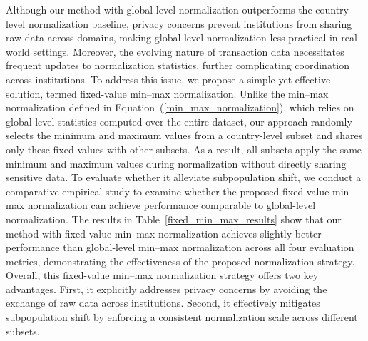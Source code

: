 Although our method with global-level normalization outperforms the country-level normalization baseline, privacy concerns prevent institutions from sharing raw data across domains, making global-level normalization less practical in real-world settings. Moreover, the evolving nature of transaction data necessitates frequent updates to normalization statistics, further complicating coordination across institutions. To address this issue, we propose a simple yet effective solution, termed fixed-value min–max normalization. Unlike the min–max normalization defined in Equation~(\ref{min_max_normalization}), which relies on global-level statistics computed over the entire dataset, our approach randomly selects the minimum and maximum values from a country-level subset and shares only these fixed values with other subsets. As a result, all subsets apply the same minimum and maximum values during normalization without directly sharing sensitive data. To evaluate whether it alleviate subpopulation shift, we conduct a comparative empirical study to examine whether the proposed fixed-value min–max normalization can achieve performance comparable to global-level normalization. The results in Table~\ref{fixed_min_max_results} show that our method with fixed-value min–max normalization achieves slightly better performance than global-level min–max normalization across all four evaluation metrics, demonstrating the effectiveness of the proposed normalization strategy. Overall, this fixed-value min–max normalization strategy offers two key advantages. First, it explicitly addresses privacy concerns by avoiding the exchange of raw data across institutions. Second, it effectively mitigates subpopulation shift by enforcing a consistent normalization scale across different subsets. 


